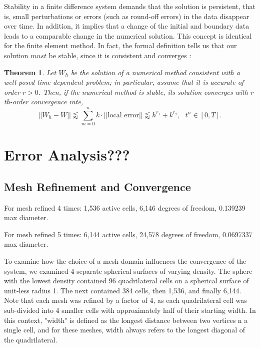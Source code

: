 \documentclass[12pt]{article}
\newtheorem{theorem}{Theorem}
\begin{document}
Stability in a finite difference system demands that the solution is persistent, that is, small perturbations or errors (such as round-off errors) in the data disappear over time. In addition, it implies that a change of the initial and boundary data leads to a comparable change in the numerical solution. This concept is identical for the finite element method. In fact, the formal definition tells us that our solution $must$ be stable, since it is consistent and converges \cite{Tadmor2012}:

\begin{theorem}
	Let $W_h$ be the solution of a numerical method consistent with a well-posed time-dependent problem; in particular, assume that it is accurate of order $r>0$. Then, if the numerical method is stable, its solution converges with $r$th-order convergence rate,
	$$||W_h - W|| \lessapprox \sum_{m=0}^n k\cdot ||\text{local error}|| \lessapprox h^{r_1} + k^{r_2}, ~~~t^n\in[0,T].$$
\end{theorem}










\pagebreak


\section{Error Analysis???}

\subsection{Mesh Refinement and Convergence}

For mesh refined 4 times: 1,536 active cells, 6,146 degrees of freedom, 0.139239 max diameter.

For mesh refined 5 times: 6,144 active cells, 24,578 degrees of freedom, 0.0697337 max diameter.

To examine how the choice of a mesh domain influences the convergence of the system, we examined 4 separate spherical surfaces of varying density. The sphere with the lowest density contained 96 quadrilateral cells on a spherical surface of unit-less radius 1. The next contained 384 cells, then 1,536, and finally 6,144. Note that each mesh was refined by a factor of 4, as each quadrilateral cell was sub-divided into 4 smaller cells with approximately half of their starting width. In this context, "width" is defined as the longest distance between two vertices n a single cell, and for these meshes, width always refers to the longest diagonal of the quadrilateral. 
\end{document}
